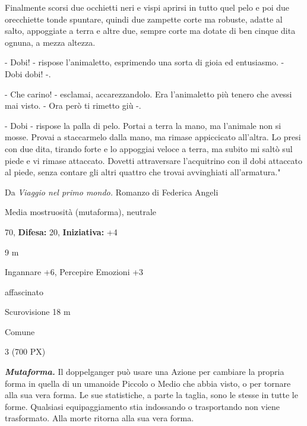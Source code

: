 \begin{multicols}{2}
{{	Finalmente scorsi due occhietti neri e vispi aprirsi in tutto quel pelo e poi due orecchiette tonde spuntare, quindi due zampette corte ma robuste, adatte al salto, appoggiate a terra e altre due, sempre corte ma dotate di ben cinque dita ognuna, a mezza altezza.

	- Dobi! - rispose l'animaletto, esprimendo una sorta di gioia ed entusiasmo. - Dobi dobi! -.

	- Che carino! - esclamai, accarezzandolo. Era l'animaletto più tenero che avessi mai visto. - Ora però ti rimetto giù -.

	- Dobi - rispose la palla di pelo.
	Portai a terra la mano, ma l'animale non si mosse. Provai a staccarmelo dalla mano, ma rimase appiccicato all'altra. Lo presi con due dita, tirando forte e lo appoggiai veloce a terra, ma subito mi saltò sul piede e vi rimase attaccato. Dovetti attraversare l'acquitrino con il dobi attaccato al piede, senza contare gli altri quattro che trovai avvinghiati all'armatura."}

Da \emph{Viaggio nel primo mondo.} Romanzo di Federica Angeli

\noindent
\begin{description}[noitemsep, topsep=0pt, parsep=0pt, partopsep=0pt, leftmargin=0cm, labelwidth=2.2cm]
	\item[\textbf{Taglia/Tipo:}] Media mostruosità (mutaforma), neutrale
	\item[\textbf{Caratt.:}] 
	\item[\textbf{Punti Ferita:}] 70,  \textbf{Difesa:} 20,  \textbf{Iniziativa:} +4
	\item[\textbf{Movimento:}] 9 m
	\item[\textbf{Tiri Salvez.:}] 
	\item[\textbf{Comp.:}] Ingannare +6, Percepire Emozioni +3
	\item[\textbf{Immunità:}] affascinato
	\item[\textbf{Sensi:}] Scurovisione 18 m
	\item[\textbf{Linguaggi:}] Comune
	\item[\textbf{Sfida:}] 3 (700 PX)\smallskip
\end{description}

\emph{\textbf{Mutaforma.}} Il doppelganger può usare una Azione per cambiare la propria forma in quella di un umanoide Piccolo o Medio che abbia visto, o per tornare alla sua vera forma. Le sue statistiche, a parte la taglia, sono le stesse in tutte le forme. Qualsiasi equipaggiamento stia indossando o trasportando non viene trasformato. Alla morte ritorna alla sua vera forma.

}
\end{multicols}

